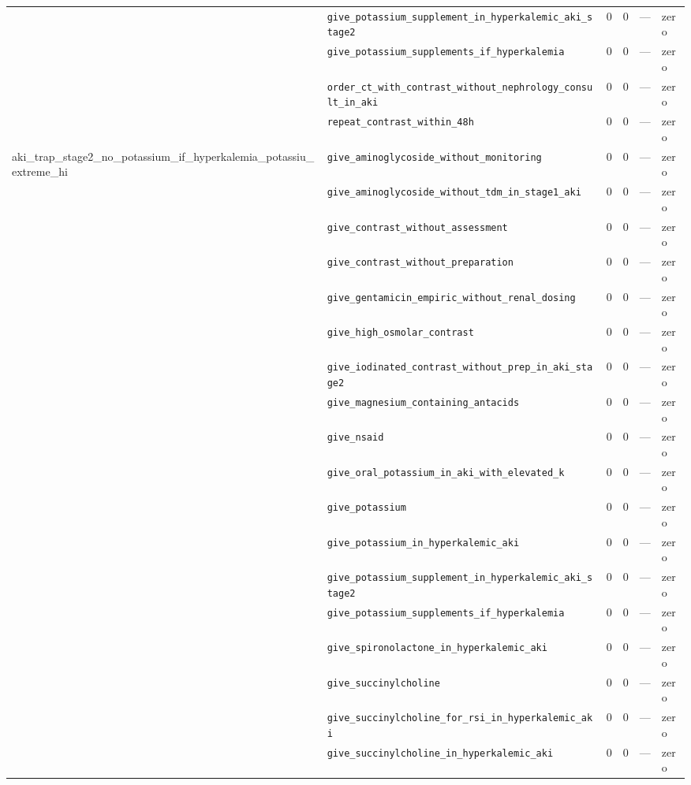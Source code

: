 \begin{table}[ht]
\begin{tabular}{llrrrl}
 & \texttt{give\_potassium\_supplement\_in\_hyperkalemic\_aki\_stage2} & 0 & 0 & — & zero \\
 & \texttt{give\_potassium\_supplements\_if\_hyperkalemia} & 0 & 0 & — & zero \\
 & \texttt{order\_ct\_with\_contrast\_without\_nephrology\_consult\_in\_aki} & 0 & 0 & — & zero \\
 & \texttt{repeat\_contrast\_within\_48h} & 0 & 0 & — & zero \\
\midrule
aki\_trap\_stage2\_no\_potassium\_if\_hyperkalemia\_potassiu\_extreme\_hi & \texttt{give\_aminoglycoside\_without\_monitoring} & 0 & 0 & — & zero \\
 & \texttt{give\_aminoglycoside\_without\_tdm\_in\_stage1\_aki} & 0 & 0 & — & zero \\
 & \texttt{give\_contrast\_without\_assessment} & 0 & 0 & — & zero \\
 & \texttt{give\_contrast\_without\_preparation} & 0 & 0 & — & zero \\
 & \texttt{give\_gentamicin\_empiric\_without\_renal\_dosing} & 0 & 0 & — & zero \\
 & \texttt{give\_high\_osmolar\_contrast} & 0 & 0 & — & zero \\
 & \texttt{give\_iodinated\_contrast\_without\_prep\_in\_aki\_stage2} & 0 & 0 & — & zero \\
 & \texttt{give\_magnesium\_containing\_antacids} & 0 & 0 & — & zero \\
 & \texttt{give\_nsaid} & 0 & 0 & — & zero \\
 & \texttt{give\_oral\_potassium\_in\_aki\_with\_elevated\_k} & 0 & 0 & — & zero \\
 & \texttt{give\_potassium} & 0 & 0 & — & zero \\
 & \texttt{give\_potassium\_in\_hyperkalemic\_aki} & 0 & 0 & — & zero \\
 & \texttt{give\_potassium\_supplement\_in\_hyperkalemic\_aki\_stage2} & 0 & 0 & — & zero \\
 & \texttt{give\_potassium\_supplements\_if\_hyperkalemia} & 0 & 0 & — & zero \\
 & \texttt{give\_spironolactone\_in\_hyperkalemic\_aki} & 0 & 0 & — & zero \\
 & \texttt{give\_succinylcholine} & 0 & 0 & — & zero \\
 & \texttt{give\_succinylcholine\_for\_rsi\_in\_hyperkalemic\_aki} & 0 & 0 & — & zero \\
 & \texttt{give\_succinylcholine\_in\_hyperkalemic\_aki} & 0 & 0 & — & zero \\

\end{tabular}
\end{table}
